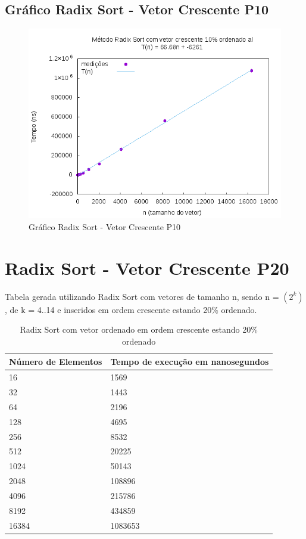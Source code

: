 \documentclass[12pt,a4paper,twoside]{report}
\begin{document}
\subsection{Gráfico Radix Sort - Vetor Crescente P10}
\begin{figure}[H]
    \centering
    \includegraphics[width=0.7\linewidth]{graficos/RadixSort/vIntCrescenteP10/vIntCrescenteP10.png}
  \caption{Gráfico Radix Sort - Vetor Crescente P10}
\end{figure}

\section{Radix Sort - Vetor Crescente P20}
Tabela gerada utilizando Radix Sort com vetores de tamanho n, sendo n = $(2^k)$, de k = 4..14 e inseridos em ordem crescente estando 20\% ordenado.
\begin{table}[H]
\centering
\caption{Radix Sort com vetor ordenado em ordem crescente estando 20\% ordenado}
\label{my-label}
\begin{tabular}{|l|l|}
\hline
\multicolumn{1}{|c|}{\textbf{Número de Elementos}} & \multicolumn{1}{c|}{\textbf{Tempo de execução em nanosegundos}} \\ \hline
16 & 1569 \\ \hline
32 & 1443 \\ \hline
64 & 2196 \\ \hline
128 & 4695 \\ \hline
256 & 8532 \\ \hline
512 & 20225 \\ \hline
1024 & 50143 \\ \hline
2048 & 108896 \\ \hline
4096 & 215786 \\ \hline
8192 & 434859 \\ \hline
16384 & 1083653 \\ \hline
\end{tabular}
\end{table}
\end{document}
